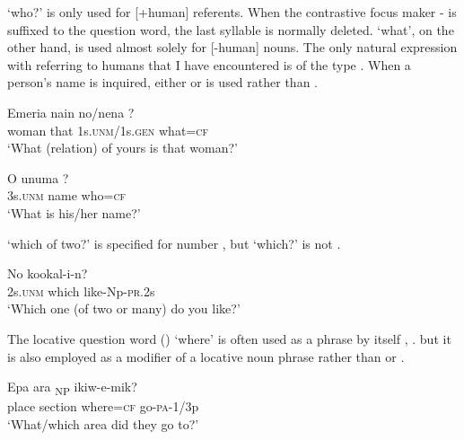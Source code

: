  `who?' is only used for [+human] referents. When the contrastive focus maker - is suffixed to the question word, the last syllable is normally deleted.  `what', on the other hand, is used almost solely for [-human] nouns. The only natural expression with  referring to humans that I have encountered is of the type . When a person's name is inquired, either   or   is used rather than .

\ea%
\label{ex:3:x649}
\gll Emeria nain no/nena ? \\
woman that 1s.\textsc{unm}/1s.\textsc{gen} what=\textsc{cf}\\
\glt`What (relation) of yours is that woman?'
\z

\ea%
\label{ex:3:x1855}
\gll O unuma ? \\
3s.\textsc{unm} name who=\textsc{cf}\\
\glt`What is his/her name?'
\z

 `which of two?' is specified for number , but  `which?' is not .

\ea%
\label{ex:3:x691}
\gll No  kookal-i-n? \\
2s.\textsc{unm} which like-Np-\textsc{pr}.2s\\
\glt`Which one (of two or many) do you like?'
\z

The locative question word () `where' is often used as a phrase by itself , . but it is also employed as a modifier of a locative noun phrase rather than  or  . 

\ea%
\label{ex:3:x1853}
\gll {\ob}Epa ara \textsubscript{NP} ikiw-e-mik? \\
place section where=\textsc{cf} go-\textsc{pa}-1/3p\\
\glt`What/which area did they go to?'
\z

